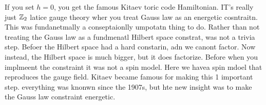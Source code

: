 If you set $h=0$,
you get the famous Kitaev toric code Hamiltonian.
IT's really just $\mathbb{Z}_2$ latice gauge theory wher you treat Gauss law as an
energetic cosntraitn.
This was fundanetmally a conseptaionlly umpotatn thing to  do.
Rather than not treating the Gauss law as a fundmenatl Hilbert space constrat,
was not a trivia step.
Befoer the Hilbert space had a hard constarin,
adn we canont factor.
Now instead,
the Hilbert space is much bigger,
but it does factorize.
Before when you implmeent the constraint it was not a spin model.
Here we havea spin mdoel that reproduces the gauge field.
Kitaev became famous for making this 1 important step.
everything was knonwn since the 1907s,
but hte new insight was to make the Gauss law constraint energetic.
